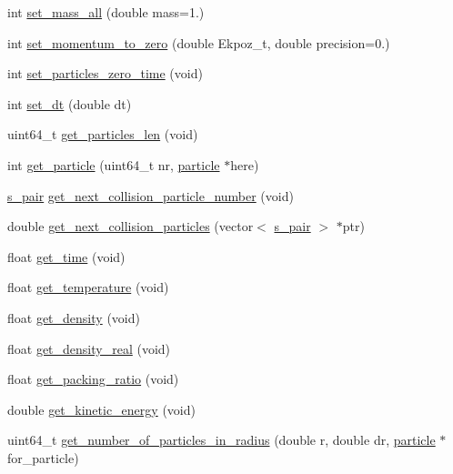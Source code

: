 \begin{DoxyCompactItemize}
\item 
int \mbox{\hyperlink{classClassSiec_a2adaa0e7fe44a2a68b7eba11c52d21bd}{set\+\_\+mass\+\_\+all}} (double mass=1.)
\item 
int \mbox{\hyperlink{classClassSiec_ab2a445e522e2d8c59177fd28c074c1c1}{set\+\_\+momentum\+\_\+to\+\_\+zero}} (double Ekpoz\+\_\+t, double precision=0.)
\item 
int \mbox{\hyperlink{classClassSiec_a37811fccdbeb4119061a02cfb9386677}{set\+\_\+particles\+\_\+zero\+\_\+time}} (void)
\item 
int \mbox{\hyperlink{classClassSiec_a2ef8ae6a08683c8ed1c4e9d89b79e08e}{set\+\_\+dt}} (double dt)
\item 
uint64\+\_\+t \mbox{\hyperlink{classClassSiec_a5fa315d36ce3648e5e5c2bf66b744e18}{get\+\_\+particles\+\_\+len}} (void)
\item 
int \mbox{\hyperlink{classClassSiec_aa4c36868471f5747008cea881f1038c1}{get\+\_\+particle}} (uint64\+\_\+t nr, \mbox{\hyperlink{structparticle}{particle}} $\ast$here)
\item 
\mbox{\hyperlink{structs__pair}{s\+\_\+pair}} \mbox{\hyperlink{classClassSiec_a1f8a44832453567a2eeed85fe038ca01}{get\+\_\+next\+\_\+collision\+\_\+particle\+\_\+number}} (void)
\item 
double \mbox{\hyperlink{classClassSiec_a654072dec38aee93903bdce321890a80}{get\+\_\+next\+\_\+collision\+\_\+particles}} (vector$<$ \mbox{\hyperlink{structs__pair}{s\+\_\+pair}} $>$ $\ast$ptr)
\item 
float \mbox{\hyperlink{classClassSiec_a27ab9475c3e1da5cba2c8dce28e12444}{get\+\_\+time}} (void)
\item 
float \mbox{\hyperlink{classClassSiec_ae0e08ad933601148dcd2edc998c17a61}{get\+\_\+temperature}} (void)
\item 
float \mbox{\hyperlink{classClassSiec_a1ea898d8e6cb52ffc47e7490e48894e4}{get\+\_\+density}} (void)
\item 
float \mbox{\hyperlink{classClassSiec_aad61574e5a2c57c21f3404b7a60ee189}{get\+\_\+density\+\_\+real}} (void)
\item 
float \mbox{\hyperlink{classClassSiec_a1b7f3db9473b2660b3a6c1dfeee45e22}{get\+\_\+packing\+\_\+ratio}} (void)
\item 
double \mbox{\hyperlink{classClassSiec_ae5515f653846b695b3ab00682d15c6fc}{get\+\_\+kinetic\+\_\+energy}} (void)
\item 
uint64\+\_\+t \mbox{\hyperlink{classClassSiec_ac5f8e08337a1ef96531495a6aee8bfb9}{get\+\_\+number\+\_\+of\+\_\+particles\+\_\+in\+\_\+radius}} (double r, double dr, \mbox{\hyperlink{structparticle}{particle}} $\ast$for\+\_\+particle)

\end{DoxyCompactItemize}
